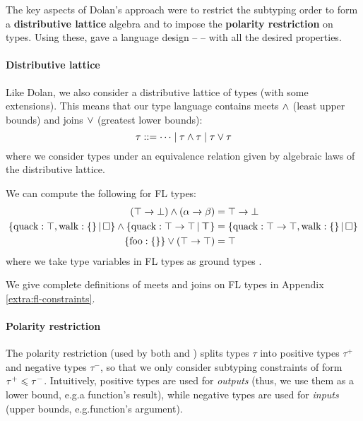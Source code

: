 The key aspects of Dolan's approach were to restrict the subtyping order to form a \textbf{distributive lattice} algebra and to impose the \textbf{polarity restriction} on types. Using these, \textcite{mlsub} gave a language design -- \mlsub{} -- with all the desired properties.

\paragraph{Distributive lattice} Like Dolan, we also consider a distributive lattice of types (with some extensions). This means that our type language contains meets $\land$ (least upper bounds) and joins $\lor$ (greatest lower bounds):
$$ \tau ::= \cdots \mid \tau \land \tau \mid \tau \lor \tau $$
where we consider types under an equivalence relation given by algebraic laws of the distributive lattice. 

\begin{example}
    We can compute the following for FL types:
    \begin{align*}
        (\top \to \bot) \meet (\alpha \to \beta) &= \top \to \bot \\ 
        \flext{\mathrm{quack} : \top, \mathrm{walk} : \flrec{}}{\flabsent} \meet \flext{\mathrm{quack} : \top \to \top}{\flftop} &= \flext{\mathrm{quack}: \top \to \top, \mathrm{walk}: \flrec{}}{\flabsent} \\ 
        \flrec{\mathrm{foo}: \flrec{}} \join (\top \to \top) &= \top
    \end{align*}
    where we take type variables in FL types as ground types \cite{tapl}. 
    
    We give complete definitions of meets and joins on FL types in Appendix \ref{extra:fl-constraints}.
\end{example}

\paragraph{Polarity restriction} The polarity restriction (used by both \textcite{dolan-thesis} and \textcite{pottier-thesis}) splits types $\tau$ into positive types $\tau^+$ and negative types $\tau^-$, so that we only consider subtyping constraints of form $\tau^+ \leqslant \tau^-$. Intuitively, positive types are used for \emph{outputs} (thus, we use them as a lower bound, e.g.\@ a function's result), while negative types are used for \emph{inputs} (upper bounds, e.g.\@ function's argument).

